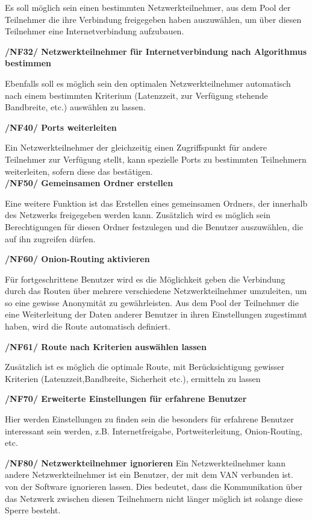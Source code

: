\documentclass[a4paper,12pt]{scrreprt}
\begin{document}
	Es soll möglich sein einen bestimmten Netzwerkteilnehmer, aus dem Pool der Teilnehmer die ihre Verbindung freigegeben haben auszuwählen, um über diesen Teilnehmer eine Internetverbindung aufzubauen.
	
	\textbf {/NF32/ Netzwerkteilnehmer für Internetverbindung nach Algorithmus bestimmen}
	
	Ebenfalls soll es möglich sein den optimalen Netzwerkteilnehmer automatisch nach einem bestimmten Kriterium (Latenzzeit, zur Verfügung stehende Bandbreite, etc.) auswählen zu lassen.
	
	\textbf {/NF40/ Ports weiterleiten}
	
	Ein Netzwerkteilnehmer der gleichzeitig einen Zugriffspunkt für andere Teilnehmer zur Verfügung stellt, kann spezielle Ports zu bestimmten Teilnehmern weiterleiten, sofern diese das bestätigen.\\
	
	\textbf {/NF50/ Gemeinsamen Ordner erstellen}
	
	Eine weitere Funktion ist das Erstellen eines gemeinsamen Ordners, der innerhalb des Netzwerks freigegeben werden kann. Zusätzlich wird es möglich sein Berechtigungen für diesen Ordner festzulegen und die Benutzer auszuwählen, die auf ihn zugreifen dürfen.
	
	\textbf {/NF60/ Onion-Routing aktivieren}
	
	Für fortgeschrittene Benutzer wird es die Möglichkeit geben die Verbindung durch das Routen über mehrere verschiedene Netzwerkteilnehmer umzuleiten, um so eine gewisse Anonymität zu gewährleisten. Aus dem Pool der Teilnehmer die eine Weiterleitung der Daten anderer Benutzer in ihren Einstellungen zugestimmt haben, wird die Route automatisch definiert.
	
	\textbf {/NF61/ Route nach Kriterien auswählen lassen}
	
	Zusätzlich ist es möglich die optimale Route, mit Berücksichtigung gewisser Kriterien (Latenzzeit,Bandbreite, Sicherheit etc.), ermitteln zu lassen
	
	\textbf {/NF70/ Erweiterte Einstellungen für erfahrene Benutzer}
	
	Hier werden Einstellungen zu finden sein die besonders für erfahrene Benutzer interessant sein werden, z.B. Internetfreigabe, Portweiterleitung, Onion-Routing, etc.
	
	\textbf {/NF80/ Netzwerkteilnehmer ignorieren}	
	Ein Netzwerkteilnehmer kann andere Netzwerkteilnehmer ist ein Benutzer, der mit dem VAN verbunden ist. von der Software ignorieren lassen. Dies bedeutet, dass die Kommunikation über das Netzwerk zwischen diesen Teilnehmern nicht länger möglich ist solange diese Sperre besteht.
	
\end{document}
